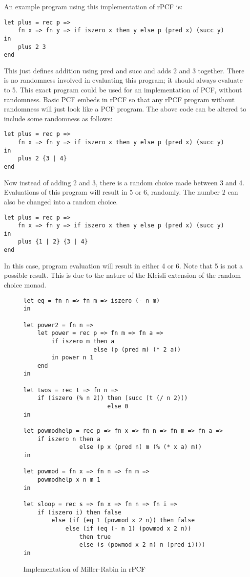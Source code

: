 An example program using this implementation of rPCF is:
\begin{lstlisting}[language=rPCF]
let plus = rec p =>
    fn x => fn y => if iszero x then y else p (pred x) (succ y)
in
    plus 2 3
end
\end{lstlisting}
This just defines addition using pred and succ and adds 2 and 3 together.  There is no randomness involved in evaluating this program; it should always evaluate to 5.  This exact program could be used for an implementation of PCF, without randomness.  Basic PCF embeds in rPCF so that any rPCF program without randomness will just look like a PCF program.  The above code can be altered to include some randomness as follows:
\begin{lstlisting}[language=rPCF]
let plus = rec p =>
    fn x => fn y => if iszero x then y else p (pred x) (succ y)
in
    plus 2 {3 | 4}
end
\end{lstlisting}
Now instead of adding 2 and 3, there is a random choice made between 3 and 4.  Evaluations of this program will result in 5 or 6, randomly.  The number 2 can also be changed into a random choice.
\begin{lstlisting}[language=rPCF]
let plus = rec p =>
    fn x => fn y => if iszero x then y else p (pred x) (succ y)
in
    plus {1 | 2} {3 | 4}
end
\end{lstlisting}
In this case, program evaluation will result in either 4 or 6.  Note that 5 is not a possible result.  This is due to the nature of the Kleisli extension of the random choice monad.

\begin{figure}
\begin{lstlisting}[language=rPCF]
let eq = fn n => fn m => iszero (- n m)
in

let power2 = fn n => 
    let power = rec p => fn m => fn a => 
        if iszero m then a 
                    else (p (pred m) (* 2 a))
        in power n 1
    end
in

let twos = rec t => fn n =>
    if (iszero (% n 2)) then (succ (t (/ n 2))) 
                        else 0
in
	
let powmodhelp = rec p => fn x => fn n => fn m => fn a => 
    if iszero n then a 
                else (p x (pred n) m (% (* x a) m))
in

let powmod = fn x => fn n => fn m => 
    powmodhelp x n m 1
in
	
let sloop = rec s => fn x => fn n => fn i =>
    if (iszero i) then false 
        else (if (eq 1 (powmod x 2 n)) then false 
            else (if (eq (- n 1) (powmod x 2 n))
                then true 
                else (s (powmod x 2 n) n (pred i))))
in
\end{lstlisting}
\caption{Implementation of Miller-Rabin in rPCF} \label{rpcfmr1}
\end{figure}


